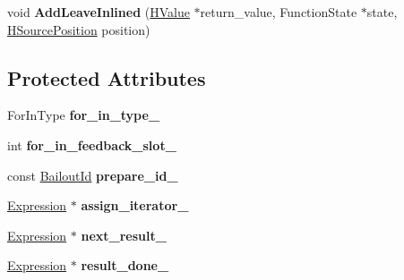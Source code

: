 \begin{DoxyCompactItemize}
\item 
\hypertarget{classv8_1_1internal_1_1_v8___f_i_n_a_l_a617382a511f96e0827a1e8b1199028b8}{}void {\bfseries Add\+Leave\+Inlined} (\hyperlink{classv8_1_1internal_1_1_h_value}{H\+Value} $\ast$return\+\_\+value, Function\+State $\ast$state, \hyperlink{classv8_1_1internal_1_1_h_source_position}{H\+Source\+Position} position)\label{classv8_1_1internal_1_1_v8___f_i_n_a_l_a617382a511f96e0827a1e8b1199028b8}

\end{DoxyCompactItemize}
\subsection*{Protected Attributes}
\begin{DoxyCompactItemize}
\item 
\hypertarget{classv8_1_1internal_1_1_v8___f_i_n_a_l_aa1736636a2a096321c30fa57fd8a1c60}{}For\+In\+Type {\bfseries for\+\_\+in\+\_\+type\+\_\+}\label{classv8_1_1internal_1_1_v8___f_i_n_a_l_aa1736636a2a096321c30fa57fd8a1c60}

\item 
\hypertarget{classv8_1_1internal_1_1_v8___f_i_n_a_l_a1a93e86adaa09fa7c14c15b4ff91d95c}{}int {\bfseries for\+\_\+in\+\_\+feedback\+\_\+slot\+\_\+}\label{classv8_1_1internal_1_1_v8___f_i_n_a_l_a1a93e86adaa09fa7c14c15b4ff91d95c}

\item 
\hypertarget{classv8_1_1internal_1_1_v8___f_i_n_a_l_aa009196e3dea1907fce1a12b42ff7d48}{}const \hyperlink{classv8_1_1internal_1_1_bailout_id}{Bailout\+Id} {\bfseries prepare\+\_\+id\+\_\+}\label{classv8_1_1internal_1_1_v8___f_i_n_a_l_aa009196e3dea1907fce1a12b42ff7d48}

\item 
\hypertarget{classv8_1_1internal_1_1_v8___f_i_n_a_l_ac7412268f612d04911a6f83c90abf722}{}\hyperlink{classv8_1_1internal_1_1_expression}{Expression} $\ast$ {\bfseries assign\+\_\+iterator\+\_\+}\label{classv8_1_1internal_1_1_v8___f_i_n_a_l_ac7412268f612d04911a6f83c90abf722}

\item 
\hypertarget{classv8_1_1internal_1_1_v8___f_i_n_a_l_af4c092d62bfc518ce1d3ca1015913a8a}{}\hyperlink{classv8_1_1internal_1_1_expression}{Expression} $\ast$ {\bfseries next\+\_\+result\+\_\+}\label{classv8_1_1internal_1_1_v8___f_i_n_a_l_af4c092d62bfc518ce1d3ca1015913a8a}

\item 
\hypertarget{classv8_1_1internal_1_1_v8___f_i_n_a_l_a8e53cb7e6f026027b0659eaff0dbfe92}{}\hyperlink{classv8_1_1internal_1_1_expression}{Expression} $\ast$ {\bfseries result\+\_\+done\+\_\+}\label{classv8_1_1internal_1_1_v8___f_i_n_a_l_a8e53cb7e6f026027b0659eaff0dbfe92}


\end{DoxyCompactItemize}
